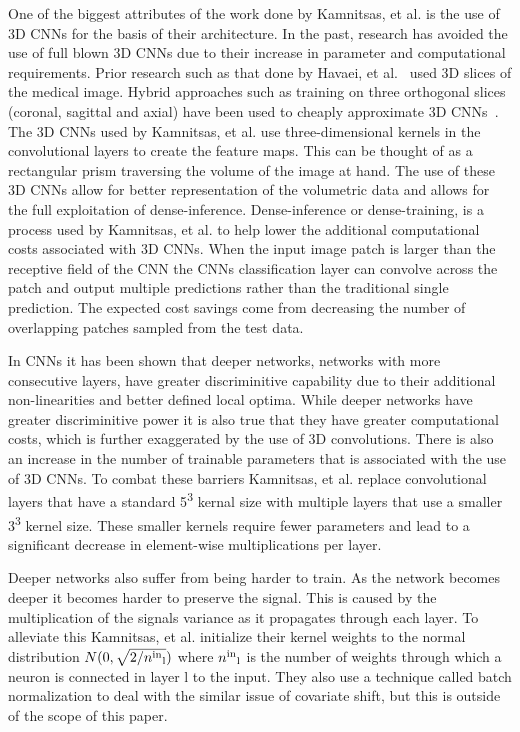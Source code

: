 \documentclass{sig-alternate}
\begin{document}
One of the biggest attributes of the work done by Kamnitsas, et al. is the use of 3D CNNs for the basis of their architecture. In the past, research has avoided the use of full blown 3D CNNs due to their increase in parameter and computational requirements. Prior research such as that done by Havaei, et al.~\cite{Havaei:2017} used 3D slices of the medical image. Hybrid approaches such as training on three orthogonal slices (coronal, sagittal and axial) have been used to cheaply approximate 3D CNNs~\cite{Roth:2014}. The 3D CNNs used by Kamnitsas, et al. use three-dimensional kernels in the convolutional layers to create the feature maps. This can be thought of as a rectangular prism traversing the volume of the image at hand. The use of these 3D CNNs allow for better representation of the volumetric data and allows for the full exploitation of dense-inference. Dense-inference or dense-training, is a process used by Kamnitsas, et al. to help lower the additional computational costs associated with 3D CNNs. When the input image patch is larger than the receptive field of the CNN the CNNs classification layer can convolve across the patch and output multiple predictions rather than the traditional single prediction. The expected cost savings come from decreasing the number of overlapping patches sampled from the test data.


In CNNs it has been shown that deeper networks, networks with more consecutive layers, have greater discriminitive capability due to their additional non-linearities and better defined local optima. While deeper networks have greater discriminitive power it is also true that they have greater computational costs, which is further exaggerated by the use of 3D convolutions. There is also an increase in the number of trainable parameters that is associated with the use of 3D CNNs. To combat these barriers Kamnitsas, et al. replace convolutional layers that have a standard 5\textsuperscript{3} kernal size with multiple layers that use a smaller 3\textsuperscript{3} kernel size. These smaller kernels require fewer parameters and lead to a significant decrease in element-wise multiplications per layer. ~\cite{Kamnitsas:2017}

Deeper networks also suffer from being harder to train. As the network becomes deeper it becomes harder to preserve the signal. This is caused by the multiplication of the signals variance as it propagates through each layer. To alleviate this Kamnitsas, et al. initialize their kernel weights to the normal distribution $N(0,\sqrt{2/n\textsuperscript{in}\textsubscript{l}})$ where $n\textsuperscript{in}\textsubscript{l}$ is the number of weights through which a neuron is connected in layer l to the input. They also use a technique called batch normalization to deal with the similar issue of covariate shift, but this is outside of the scope of this paper.
\end{document}
